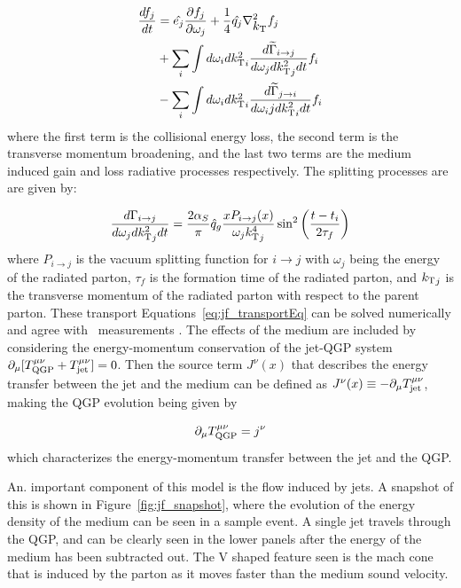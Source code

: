 \begin{align}
\label{eq:jf_transportEq}
\frac{d f_j}{dt} &= \hat{e_j} \frac{\partial f_j}{\partial \omega_j} + \frac{1}{4} \hat{q_j} \nabla_{\mbox{$k_{\rm T}$}}^2 f_j  \\
& + \sum_i \int d\omega_i d\mbox{$k_{\rm T}^2$}_i \frac{d\widetilde{\Gamma}_{i\rightarrow j} }{d\omega_j d\mbox{$k_{\rm T}^2$}_j dt} f_i \\
& - \sum_i \int d\omega_i d\mbox{$k_{\rm T}^2$}_i \frac{d\widetilde{\Gamma}_{j\rightarrow i} }{d\omega_ij d\mbox{$k_{\rm T}^2$}_i dt} f_i \\
\end{align}
where the first term is the collisional energy loss, the second term is the transverse momentum broadening, and the last two terms are the medium induced gain and loss radiative processes respectively. The splitting processes are are given by:

\begin{align}
\frac{d\Gamma_{i \rightarrow j}}{d \omega_j d\mbox{$k_{\rm T}^2$}_j dt} = \frac{2\alpha_S}{\pi} \hat{q}_g \frac{x P_{i \rightarrow j} (x)}{\omega_j {k_{\rm T}^4}_j} \sin^2 \left(\dfrac{t - t_i}{2\tau_f} \right)
\end{align}
where $P_{i \rightarrow j} $ is the vacuum splitting function for $i \rightarrow j $ with $\omega_j$ being the energy of the radiated parton, $\tau_f$ is the formation time of the radiated parton, and $\mbox{$k_{\rm T}$}_j$ is the transverse momentum of the radiated parton with respect to the parent parton. These transport Equations~\ref{eq:jf_transportEq} can be solved numerically and agree with \RAA\ measurements \cite{Aad:2014bxa, Khachatryan:2016jfl, Abelev:2013kqa}. The effects of the medium are included by considering the energy-momentum conservation of the jet-QGP system $ \partial_\mu [T_{\rm QGP}^{\mu\nu} + T_{\rm jet}^{\mu\nu}] = 0$. Then the source term $J^\nu(x)$ that describes the energy transfer between the jet and the medium can be defined as $J^\nu(x) \equiv -\partial_\mu  T_{\rm jet}^{\mu\nu}$, making the QGP evolution being given by

\begin{align}
 \partial_\mu T_{\rm QGP}^{\mu\nu} = j^\nu
\end{align}
which characterizes the energy-momentum transfer between the jet and the QGP. 

An. important component of this model is the flow induced by jets. A snapshot of this is shown in Figure~\ref{fig:jf_snapshot}, where the evolution of the energy density of the medium can be seen in a sample event. A single jet travels through the QGP, and can be clearly seen in the lower panels after the energy of the medium has been subtracted out. The V shaped feature seen is the mach cone that is induced by the parton as it moves faster than the medium sound velocity. 

